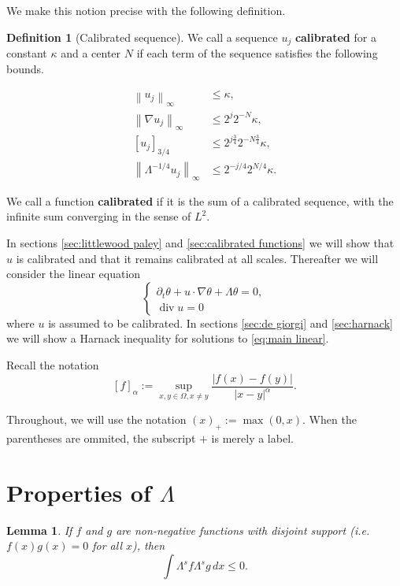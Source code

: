 \documentclass[11pt]{amsart}
\newtheorem{lemma}[theorem]{Lemma}
\theoremstyle{remark}
\theoremstyle{definition}
\newtheorem{definition}{Definition}
\newcommand{\norm}[1]{\left\lVert#1\right\rVert}
\newcommand{\bracket}[1]{\left[ #1 \right]}
\newcommand{\del}{\partial}
\newcommand{\grad}{\nabla}
\renewcommand{\div}{\operatorname{div}}
\begin{document}
We make this notion precise with the following definition.  

\begin{definition}[Calibrated sequence]
We call a sequence $u_j$ \textbf{calibrated} for a constant $\kappa$ and a center $N$ if each term of the sequence satisfies the following bounds.  

\begin{align*}
\norm{u_j}_\infty &\leq \kappa, \\
\norm{\grad u_j}_\infty &\leq 2^{j} 2^{-N} \kappa, \\
\bracket{u_j}_{3/4} &\leq 2^{j \frac{3}{4}} 2^{- N \frac{3}{4}} \kappa, \\
\norm{\Lambda^{-1/4} u_j}_\infty &\leq 2^{-j/4} 2^{N/4} \kappa.  
\end{align*} 

We call a function \textbf{calibrated} if it is the sum of a calibrated sequence, with the infinite sum converging in the sense of $L^2$.  

\end{definition}

In sections \ref{sec:littlewood paley} and \ref{sec:calibrated functions} we will show that $u$ is calibrated and that it remains calibrated at all scales.  Thereafter we will consider the linear equation
\begin{equation} \label{eq:main linear} \begin{cases}
\del_t \theta + u \cdot \grad \theta + \Lambda \theta = 0, \\
\div u = 0
\end{cases} \end{equation}
where $u$ is assumed to be calibrated.  In sections \ref{sec:de giorgi} and \ref{sec:harnack} we will show a Harnack inequality for solutions to \eqref{eq:main linear}.  

Recall the notation
\[ \bracket{f}_\alpha := \sup_{x,y \in \Omega, x \neq y} \frac{|f(x)-f(y)|}{|x-y|^\alpha}. \]

Throughout, we will use the notation $(x)_+ := \max(0,x)$.  When the parentheses are ommited, the subscript $+$ is merely a label.  


\section{Properties of $\Lambda$} \label{sec:lemmas}

\begin{lemma} \label{thm:disjoint}
If $f$ and $g$ are non-negative functions with disjoint support (i.e. $f(x)g(x) = 0$ for all $x$), then 
\[ \int \Lambda^s f \Lambda^s g \,dx \leq 0. \]
\end{lemma}
\end{document}
